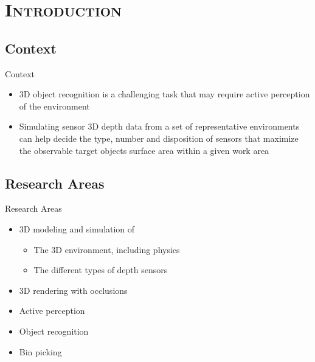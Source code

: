 \section{\scshape Introduction}\label{sec:introduction}

\subsection{Context}
\begin{frame}{Context}
	\begin{itemize}
		\item 3D object recognition is a challenging task that may require active perception of the environment
		\item Simulating sensor 3D depth data from a set of representative environments can help decide the type, number and disposition of sensors that maximize the observable target objects surface area within a given work area
	\end{itemize}
\end{frame}


\subsection{Research Areas}
\begin{frame}{Research Areas}
	\begin{itemize}
		\item 3D modeling and simulation of
		\begin{itemize}
			\item The 3D environment, including physics
			\item The different types of depth sensors
		\end{itemize}
		\item 3D rendering with occlusions
		\item Active perception
		\item Object recognition
		\item Bin picking
	\end{itemize}
\end{frame}

